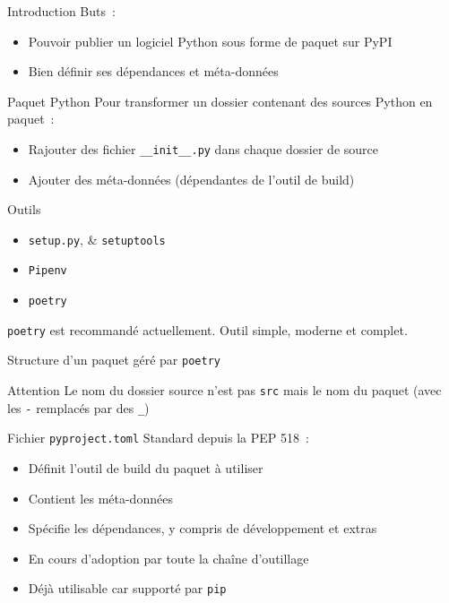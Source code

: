 \begin{frame}{Introduction}
  Buts~:
  \begin{itemize}
    \item Pouvoir publier un logiciel Python sous forme de paquet sur PyPI
    \item Bien définir ses dépendances et méta-données
  \end{itemize}
\end{frame}

\begin{frame}{Paquet Python}
  Pour transformer un dossier contenant des sources Python en paquet~:

  \begin{itemize}
    \item Rajouter des fichier \texttt{\_\_init\_\_.py} dans chaque dossier de source
    \item Ajouter des méta-données (dépendantes de l'outil de build)
  \end{itemize}
\end{frame}

\begin{frame}{Outils}
  \begin{itemize}
    \item \texttt{setup.py}, \& \texttt{setuptools}
    \item \texttt{Pipenv}
    \item \texttt{poetry}
  \end{itemize}

  \texttt{poetry} est recommandé actuellement. Outil simple, moderne et complet.
\end{frame}

\begin{frame}{Structure d'un paquet géré par \texttt{poetry}}
  \begin{alertblock}{Attention}
    Le nom du dossier source n'est pas \texttt{src} mais le nom du paquet (avec les \texttt{-} remplacés par des \texttt{\_})
  \end{alertblock}
\end{frame}

\begin{frame}{Fichier \texttt{pyproject.toml}}
  Standard depuis la PEP 518~:

  \begin{itemize}
    \item Définit l'outil de build du paquet à utiliser
    \item Contient les méta-données
    \item Spécifie les dépendances, y compris de développement et extras
    \item En cours d'adoption par toute la chaîne d'outillage
    \item Déjà utilisable car supporté par \texttt{pip}
  \end{itemize}
\end{frame}

